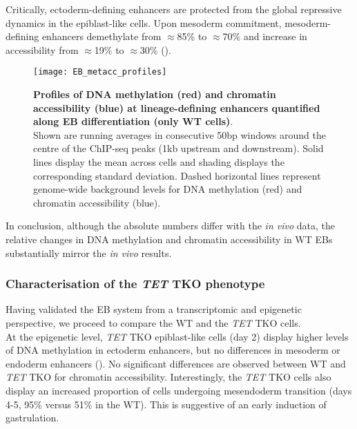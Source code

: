 Critically, ectoderm-defining enhancers are protected from the global repressive dynamics in the epiblast-like cells. Upon mesoderm commitment, mesoderm-defining enhancers demethylate from $\approx$85\% to $\approx$70\% and increase in accessibility from $\approx$19\% to $\approx$30\% ().

\begin{figure}[H]
	\centering
	\texttt{[image: EB\_metacc\_profiles]}
	\caption[]{
	\textbf{Profiles of DNA methylation (red) and chromatin accessibility (blue) at lineage-defining enhancers quantified along EB differentiation (only WT cells)}.\\
	Shown are running averages in consecutive 50bp windows around the centre of the ChIP-seq peaks (1kb upstream and downstream). Solid lines display the mean across cells and shading displays the corresponding standard deviation. Dashed horizontal lines represent genome-wide background levels for DNA methylation (red) and chromatin accessibility (blue).
	}
	\label{fig:EB_metacc_profiles}
\end{figure}

In conclusion, although the absolute numbers differ with the \textit{in vivo} data, the relative changes in DNA methylation and chromatin accessibility in WT EBs substantially mirror the \textit{in vivo} results.

\subsubsection{Characterisation of the \textit{TET} TKO phenotype}

Having validated the EB system from a transcriptomic and epigenetic perspective, we proceed to compare the WT and the \textit{TET} TKO cells.\\
At the epigenetic level, \textit{TET} TKO epiblast-like cells (day 2) display higher levels of DNA methylation in ectoderm enhancers, but no differences in mesoderm or endoderm enhancers (). No significant differences are observed between WT and \textit{TET} TKO for chromatin accessibility. Interestingly, the \textit{TET} TKO cells also display an increased proportion of cells undergoing mesendoderm transition (days 4-5, 95\% versus 51\% in the WT). This is suggestive of an early induction of gastrulation.

